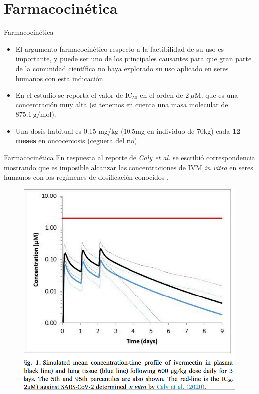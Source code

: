 \documentclass[12pt]{beamer}
\begin{document}
	\section{Farmacocinética}
	\begin{frame}{Farmacocinética}
		\small
		\begin{itemize}
	 		\item El argumento farmacocinético respecto a la factibilidad de su uso es importante, y puede ser uno de los principales causantes para que gran parte de la comunidad científica no haya explorado su uso aplicado en seres humanos con esta indicación. \\
			
			\item En el estudio se reporta el valor de $\mathrm{IC_{50}}$ en el orden de $2~\mu\mathrm{M}$, que es una concentración muy alta (si tenemos en cuenta una masa molecular de $875.1~\mathrm{g/mol}$). \\
						
			\item Una dosis habitual es 0.15 mg/kg (10.5mg en individuo de 70kg) cada \textbf{12 meses} en oncocercosis (ceguera del rio).
		\end{itemize}
	\end{frame}
	
	\begin{frame}{Farmacocinética}
		\scriptsize
		En respuesta al reporte de \textit{Caly et al.} se escribió correspondencia mostrando que es imposible alcanzar las concentraciones de IVM \textit{in vitro} en seres humanos con los regímenes de dosificación conocidos \citep{Rayner2020}. 
		\begin{figure}
			\centering\includegraphics[width=0.5\linewidth]{figs/ivermectin_profile}
		\end{figure}
	\end{frame}
	
\end{document}

